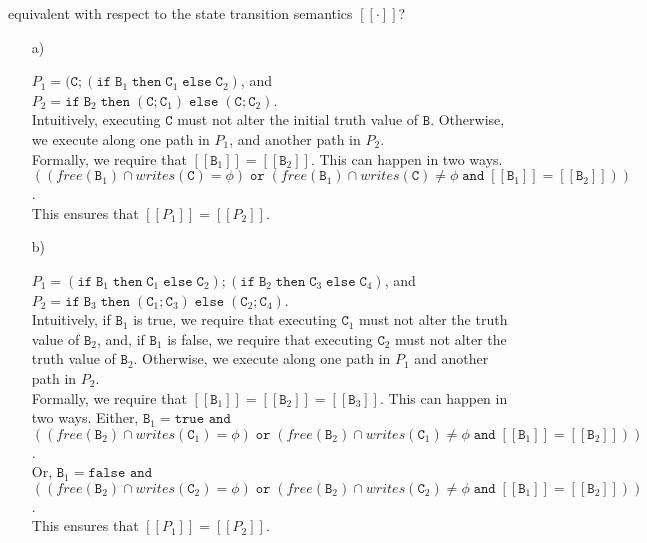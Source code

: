 \documentclass{article}
\newcommand{\B}{\mathtt{B}}
\newcommand{\C}{\mathtt{C}}
\newcommand{\true}{\mathtt{true}}
\newcommand{\false}{\mathtt{false}}
\newcommand{\andsym}{\mathtt{and}}
\newcommand{\orsym}{\mathtt{or}}
\newcommand{\ifsym}{\mathtt{if}}
\newcommand{\then}{\mathtt{then}}
\newcommand{\elsesym}{\mathtt{else}}
\begin{document}
\begin{enumerate}
{equivalent with respect to the state transition semantics $[[\cdot]]$?
}

\begin{enumerate}
  
\item[a)] 

$P_1 = (\C;(\ifsym \; \B_1 \; \then\; \C_1\; \elsesym \; \C_2)$, and\\
$P_2 = \ifsym \; \B_2 \; \then\; (\C; \C_1) \; \elsesym \; (\C; \C_2)$.\\

Intuitively, executing $\C$ must not alter the initial truth value of $\B$.
Otherwise, we execute along one path in $P_1$, and another path in $P_2$. \\

Formally, we require that $[[\B_1]] = [[\B_2]]$. 
This can happen in two ways. 
$( (free(\B_1) \cap writes(\C) = \phi) \; \orsym \; ( free(\B_1) \cap
writes(\C) \neq \phi \; \andsym \; [[\B_1]] = [[\B_2]]) )$.\\

This ensures that $[[P_1]] = [[P_2]]$. \\

\item[b)] 

$P_1 = (\ifsym \; \B_1 \; \then\; \C_1 \; \elsesym \; \C_2); (\ifsym \; \B_2 \;
\then \; \C_3 \; \elsesym \; \C_4)$, and\\
$P_2 = \ifsym \; \B_3 \; \then\; (\C_1;\C_3) \; \elsesym \; (\C_2;\C_4)$.\\

Intuitively, if $\B_1$ is true, we require that
executing $\C_1$ must not alter the truth value of $\B_2$, and, 
if $\B_1$ is false, we require that executing 
$\C_2$ must not alter the truth value of $\B_2$.
Otherwise, we execute along one path in $P_1$ and another path in $P_2$. \\

Formally, we require that $[[\B_1]] = [[\B_2]] = [[\B_3]]$. This can happen in
two ways.
Either, $\B_1 = \true$ $\andsym$ 
$( (free(\B_2) \cap writes(\C_1) = \phi) \; \orsym \; ( free(\B_2) \cap
writes(\C_1) \neq \phi \; \andsym \; [[\B_1]] = [[\B_2]]) )$.\\
Or, $\B_1 = \false$ $\andsym$ 
$( (free(\B_2) \cap writes(\C_2) = \phi) \; \orsym \; ( free(\B_2) \cap
writes(\C_2) \neq \phi \; \andsym \; [[\B_1]] = [[\B_2]]) )$.\\

This ensures that $[[P_1]] = [[P_2]]$.\\


\end{enumerate}
\end{enumerate}
\end{document}
